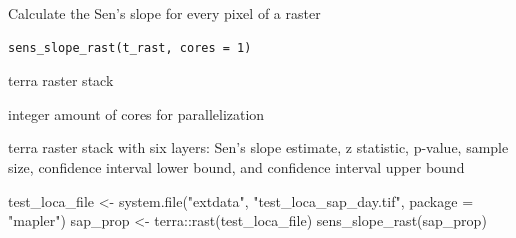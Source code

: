 %
\begin{Description}
Calculate the Sen's slope for every pixel of a raster
\end{Description}
%
\begin{Usage}
\begin{verbatim}
sens_slope_rast(t_rast, cores = 1)
\end{verbatim}
\end{Usage}
%
\begin{Arguments}
\begin{ldescription}
\item[\code{t\_rast}] terra raster stack

\item[\code{cores}] integer amount of cores for parallelization
\end{ldescription}
\end{Arguments}
%
\begin{Value}
terra raster stack with six layers: Sen's slope estimate,
z statistic, p-value, sample size, confidence interval lower bound, and
confidence interval upper bound
\end{Value}
%
\begin{Examples}
\begin{ExampleCode}
test_loca_file <- system.file("extdata", "test_loca_sap_day.tif",
                              package = "mapler")
sap_prop <- terra::rast(test_loca_file)
sens_slope_rast(sap_prop)
\end{ExampleCode}
\end{Examples}
